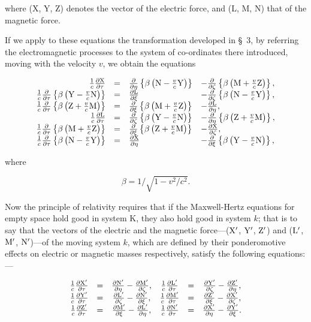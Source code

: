 \documentclass{article}
\newcommand{\dd}[2]{\frac{\partial #1}{\partial #2}}
\newcommand{\ic}{\frac{1}{c}}
\newcommand{\pr}[1]{${\rm #1}'$}
\begin{document}
\noindent
where (X, Y, Z) denotes the vector of the electric force, and (L, M,
N) that of the magnetic force.

If we apply to these equations the transformation developed in \S\ 3, by
referring the electromagnetic processes to the system of co-ordinates
there introduced, moving with the velocity $v$, we obtain the equations

\renewcommand{\arraystretch}{1.5}
{\large
\[
\begin{array}{rcll}
\frac{1}{c}\dd{\rm X}{\tau} & = & \dd{}{\eta}\left\{\beta\left({\rm N}-\frac{v}{c}{\rm Y}\right)\right\} & -\dd{}{\zeta}\left\{\beta\left({\rm M}+\frac{v}{c}{\rm Z}\right)\right\}, \\
\frac{1}{c}\dd{}{\tau}\left\{\beta\left({\rm Y}-\frac{v}{c}{\rm N}\right)\right\} & = & \dd{\rm L}{\xi} & - \dd{}{\zeta}\left\{\beta\left({\rm N}-\frac{v}{c}{\rm Y}\right)\right\}, \\
\frac{1}{c}\dd{}{\tau}\left\{\beta\left({\rm Z}+\frac{v}{c}{\rm M}\right)\right\} & = & \dd{}{\xi}\left\{\beta\left({\rm M}+\frac{v}{c}{\rm Z}\right)\right\} & - \dd{\rm L}{\eta}, \\
\frac{1}{c}\dd{\rm L}{\tau} & = & \dd{}{\zeta}\left\{\beta\left({\rm Y}-\frac{v}{c}{\rm N}\right)\right\} & - \dd{}{\eta}\left\{\beta\left({\rm Z}+\frac{v}{c}{\rm M}\right)\right\}, \\
\frac{1}{c}\dd{}{\tau}\left\{\beta\left({\rm M}+\frac{v}{c}{\rm Z}\right)\right\} & = & \dd{}{\xi}\left\{\beta\left({\rm Z}+\frac{v}{c}{\rm M}\right)\right\} & -\dd{\rm X}{\zeta}, \\
\frac{1}{c}\dd{}{\tau}\left\{\beta\left({\rm N}-\frac{v}{c}{\rm Y}\right)\right\} & = & \dd{\rm X}{\eta} & - \dd{}{\xi}\left\{\beta\left({\rm Y}-\frac{v}{c}{\rm N}\right)\right\}, \\
\end{array}
\]
}
\renewcommand{\arraystretch}{1}

\noindent
where 

\[
\beta = 1/\sqrt{1-v^2/c^2}.
\]

Now the principle of relativity requires that if the
Maxwell-Hertz equations for empty space hold good in system K,
they also hold good in system $k$; that is to say that the
vectors of the electric and the magnetic force---(\pr{X},
\pr{Y}, \pr{Z}) and (\pr{L}, \pr{M}, \pr{N})---of the moving
system $k$, which are defined by their ponderomotive effects on
electric or magnetic masses respectively, satisfy the following
equations:---

\renewcommand{\arraystretch}{1.5}
{\Large
\[
\begin{array}{cccccc}
\ic\dd{\rm X'}{\tau} & = & \dd{\rm N'}{\eta}-\dd{\rm M'}{\zeta}, & \ic\dd{\rm L'}{\tau} & = & \dd{\rm Y'}{\zeta} - \dd{\rm Z'}{\eta}, \\
\ic\dd{\rm Y'}{\tau} & = & \dd{\rm L'}{\zeta}-\dd{\rm N'}{\xi}, & \ic\dd{\rm M'}{\tau} & = & \dd{\rm Z'}{\xi} - \dd{\rm X'}{\zeta}, \\
\ic\dd{\rm Z'}{\tau} & = & \dd{\rm M'}{\xi}-\dd{\rm L'}{\eta}, & \ic\dd{\rm N'}{\tau} & = & \dd{\rm X'}{\eta} - \dd{\rm Y'}{\xi}. \\
\end{array}
\]
}
\renewcommand{\arraystretch}{1}
\end{document}
